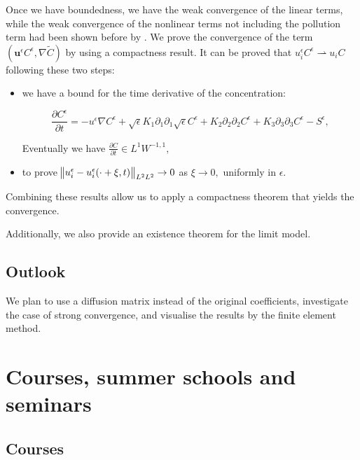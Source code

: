 \documentclass{article}
\begin{document}
  Once we have boundedness, we have the weak convergence of the linear terms, while the weak convergence of the nonlinear terms not including the pollution term had been shown before by \cite{azerad2001mathematical}. We prove the convergence of the term $(\mathbf{u}^\epsilon C^\epsilon, \nabla \tilde{C})$ by using a compactness result. It can be proved that $u_i^\epsilon C^\epsilon \rightharpoonup  u_i C$ following these two steps:
    
    \begin{itemize}
    
      \item we have a bound for the time derivative of the concentration:
      
      \[  \frac{\partial C^\epsilon}{\partial t} = - u^\epsilon \nabla C^\epsilon + \sqrt{\epsilon} K_1 \partial_1 \partial_1 \sqrt{\epsilon} C^\epsilon + K_2 \partial_2 \partial_2 C^\epsilon + K_3 \partial_3 \partial_3 C^\epsilon -S^\epsilon, \]
      
      Eventually we have $\frac{\partial C}{\partial t} \in L^1 W^{-1,1},$
      
      \item to prove $\norm{u_i^\epsilon - u_i^\epsilon (\cdot + \xi,t)}_{L^2 L^2} \to 0$ as $\xi \to 0,$ uniformly in $\epsilon.$
    
    \end{itemize}
    
    Combining these results allow us to apply a compactness theorem that yields the convergence.
    
  Additionally, we also provide an existence theorem for the limit model.


\subsection{Outlook}

We plan to use a diffusion matrix instead of the original coefficients, investigate the case of strong convergence, and visualise the results by the finite element method.

\section{Courses, summer schools and seminars}

\subsection{Courses}
\end{document}
